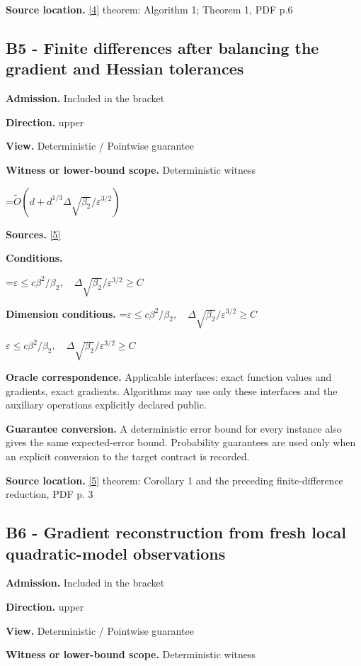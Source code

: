 \documentclass[10pt,a4paper]{article}
\newcommand{\AtlasMath}[1]{\par\begingroup\centering\setbox0=\hbox{$\displaystyle #1$}\ifdim\wd0>1.4\linewidth\typeout{ATLAS WIDE FORMULA: \the\wd0}\fi\ifdim\wd0>\linewidth\resizebox{\linewidth}{!}{\box0}\else\box0\fi\par\endgroup}
\newcommand{\AtlasInlineMath}[1]{\begingroup\setbox0=\hbox{$#1$}\ifdim\wd0>.4\linewidth\endgroup\AtlasMath{#1}\else\endgroup$#1$\fi}
\begin{document}
\textbf{Source location.} \href{https://jmlr.org/papers/volume24/22-0522/22-0522.pdf}{[4]} theorem: Algorithm 1; Theorem 1, PDF p.6

\subsection{B5 - Finite differences after balancing the gradient and Hessian tolerances}
\textbf{Admission.} Included in the bracket

\textbf{Direction.} upper

\textbf{View.} Deterministic / Pointwise guarantee

\textbf{Witness or lower-bound scope.} Deterministic witness

\AtlasMath{\widetilde{O}(d+d^{1/3}\Delta\sqrt{\beta_2}/\varepsilon^{3/2})}
\textbf{Sources.} \href{https://arxiv.org/pdf/2510.20786}{[5]}

\textbf{Conditions.} 
\AtlasMath{\varepsilon\le c\beta^2/\beta_2,\quad\Delta\sqrt{\beta_2}/\varepsilon^{3/2}\ge C}


\textbf{Dimension conditions.} \AtlasInlineMath{\varepsilon\le c\beta^2/\beta_2,\quad\Delta\sqrt{\beta_2}/\varepsilon^{3/2}\ge C}

\textbf{Oracle correspondence.} Applicable interfaces: exact function values and gradients, exact gradients. Algorithms may use only these interfaces and the auxiliary operations explicitly declared public.

\textbf{Guarantee conversion.} A deterministic error bound for every instance also gives the same expected-error bound. Probability guarantees are used only when an explicit conversion to the target contract is recorded.

\textbf{Source location.} \href{https://arxiv.org/pdf/2510.20786}{[5]} theorem: Corollary 1 and the preceding finite-difference reduction, PDF p. 3

\subsection{B6 - Gradient reconstruction from fresh local quadratic-model observations}
\textbf{Admission.} Included in the bracket

\textbf{Direction.} upper

\textbf{View.} Deterministic / Pointwise guarantee

\textbf{Witness or lower-bound scope.} Deterministic witness
\end{document}
